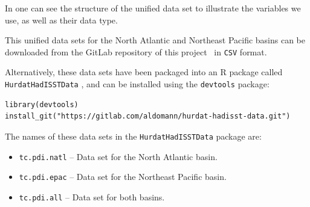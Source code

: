 In  one can see the structure of the unified data set to illustrate the variables we use, as well as their data type.
\begin{table}[H]
	\centering
	\ttfamily
	\caption{Excerpt of the North Atlantic data set}
	\label{hd:unified-dataset-head}
\end{table}

This unified data sets for the North Atlantic and Northeast Pacific basins can be downloaded from the GitLab repository of this project~\cite{o:gitlab-repo} in \texttt{CSV} format.

Alternatively, these data sets have been packaged into an R package called \texttt{HurdatHadISSTData} \cite{o:gitlab-data-repo}, and can be installed using the \texttt{devtools} package:
\begin{lstlisting}
library(devtools)
install_git("https://gitlab.com/aldomann/hurdat-hadisst-data.git")
\end{lstlisting}

The names of these data sets in the \texttt{HurdatHadISSTData} package are:
\begin{itemize}
	\item \texttt{tc.pdi.natl} -- Data set for the North Atlantic basin.
	\item \texttt{tc.pdi.epac} -- Data set for the Northeast Pacific basin.
	\item \texttt{tc.pdi.all} -- Data set for both basins.
\end{itemize}
